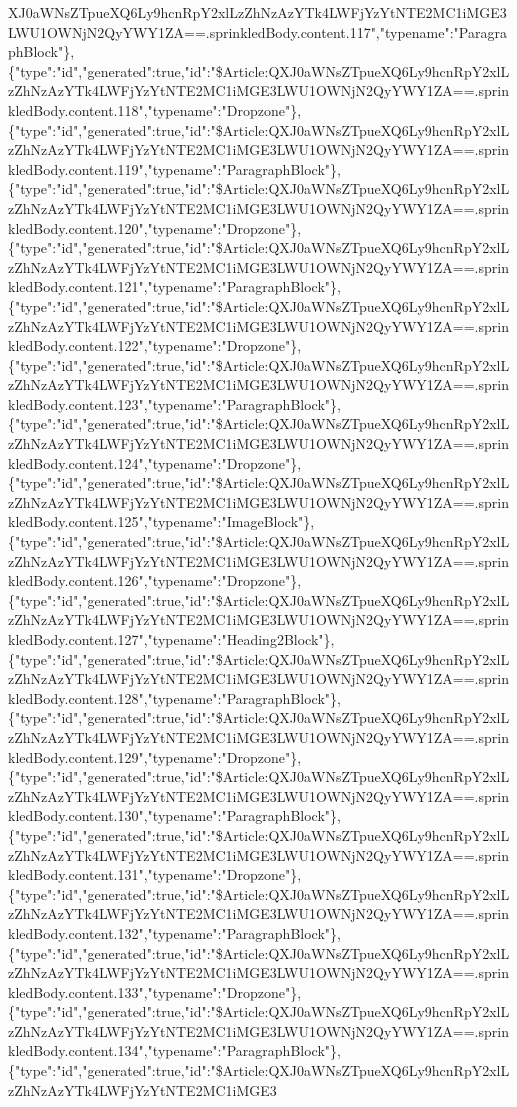 XJ0aWNsZTpueXQ6Ly9hcnRpY2xlLzZhNzAzYTk4LWFjYzYtNTE2MC1iMGE3LWU1OWNjN2QyYWY1ZA==.sprinkledBody.content.117","typename":"ParagraphBlock"\},\{"type":"id","generated":true,"id":"\$Article:QXJ0aWNsZTpueXQ6Ly9hcnRpY2xlLzZhNzAzYTk4LWFjYzYtNTE2MC1iMGE3LWU1OWNjN2QyYWY1ZA==.sprinkledBody.content.118","typename":"Dropzone"\},\{"type":"id","generated":true,"id":"\$Article:QXJ0aWNsZTpueXQ6Ly9hcnRpY2xlLzZhNzAzYTk4LWFjYzYtNTE2MC1iMGE3LWU1OWNjN2QyYWY1ZA==.sprinkledBody.content.119","typename":"ParagraphBlock"\},\{"type":"id","generated":true,"id":"\$Article:QXJ0aWNsZTpueXQ6Ly9hcnRpY2xlLzZhNzAzYTk4LWFjYzYtNTE2MC1iMGE3LWU1OWNjN2QyYWY1ZA==.sprinkledBody.content.120","typename":"Dropzone"\},\{"type":"id","generated":true,"id":"\$Article:QXJ0aWNsZTpueXQ6Ly9hcnRpY2xlLzZhNzAzYTk4LWFjYzYtNTE2MC1iMGE3LWU1OWNjN2QyYWY1ZA==.sprinkledBody.content.121","typename":"ParagraphBlock"\},\{"type":"id","generated":true,"id":"\$Article:QXJ0aWNsZTpueXQ6Ly9hcnRpY2xlLzZhNzAzYTk4LWFjYzYtNTE2MC1iMGE3LWU1OWNjN2QyYWY1ZA==.sprinkledBody.content.122","typename":"Dropzone"\},\{"type":"id","generated":true,"id":"\$Article:QXJ0aWNsZTpueXQ6Ly9hcnRpY2xlLzZhNzAzYTk4LWFjYzYtNTE2MC1iMGE3LWU1OWNjN2QyYWY1ZA==.sprinkledBody.content.123","typename":"ParagraphBlock"\},\{"type":"id","generated":true,"id":"\$Article:QXJ0aWNsZTpueXQ6Ly9hcnRpY2xlLzZhNzAzYTk4LWFjYzYtNTE2MC1iMGE3LWU1OWNjN2QyYWY1ZA==.sprinkledBody.content.124","typename":"Dropzone"\},\{"type":"id","generated":true,"id":"\$Article:QXJ0aWNsZTpueXQ6Ly9hcnRpY2xlLzZhNzAzYTk4LWFjYzYtNTE2MC1iMGE3LWU1OWNjN2QyYWY1ZA==.sprinkledBody.content.125","typename":"ImageBlock"\},\{"type":"id","generated":true,"id":"\$Article:QXJ0aWNsZTpueXQ6Ly9hcnRpY2xlLzZhNzAzYTk4LWFjYzYtNTE2MC1iMGE3LWU1OWNjN2QyYWY1ZA==.sprinkledBody.content.126","typename":"Dropzone"\},\{"type":"id","generated":true,"id":"\$Article:QXJ0aWNsZTpueXQ6Ly9hcnRpY2xlLzZhNzAzYTk4LWFjYzYtNTE2MC1iMGE3LWU1OWNjN2QyYWY1ZA==.sprinkledBody.content.127","typename":"Heading2Block"\},\{"type":"id","generated":true,"id":"\$Article:QXJ0aWNsZTpueXQ6Ly9hcnRpY2xlLzZhNzAzYTk4LWFjYzYtNTE2MC1iMGE3LWU1OWNjN2QyYWY1ZA==.sprinkledBody.content.128","typename":"ParagraphBlock"\},\{"type":"id","generated":true,"id":"\$Article:QXJ0aWNsZTpueXQ6Ly9hcnRpY2xlLzZhNzAzYTk4LWFjYzYtNTE2MC1iMGE3LWU1OWNjN2QyYWY1ZA==.sprinkledBody.content.129","typename":"Dropzone"\},\{"type":"id","generated":true,"id":"\$Article:QXJ0aWNsZTpueXQ6Ly9hcnRpY2xlLzZhNzAzYTk4LWFjYzYtNTE2MC1iMGE3LWU1OWNjN2QyYWY1ZA==.sprinkledBody.content.130","typename":"ParagraphBlock"\},\{"type":"id","generated":true,"id":"\$Article:QXJ0aWNsZTpueXQ6Ly9hcnRpY2xlLzZhNzAzYTk4LWFjYzYtNTE2MC1iMGE3LWU1OWNjN2QyYWY1ZA==.sprinkledBody.content.131","typename":"Dropzone"\},\{"type":"id","generated":true,"id":"\$Article:QXJ0aWNsZTpueXQ6Ly9hcnRpY2xlLzZhNzAzYTk4LWFjYzYtNTE2MC1iMGE3LWU1OWNjN2QyYWY1ZA==.sprinkledBody.content.132","typename":"ParagraphBlock"\},\{"type":"id","generated":true,"id":"\$Article:QXJ0aWNsZTpueXQ6Ly9hcnRpY2xlLzZhNzAzYTk4LWFjYzYtNTE2MC1iMGE3LWU1OWNjN2QyYWY1ZA==.sprinkledBody.content.133","typename":"Dropzone"\},\{"type":"id","generated":true,"id":"\$Article:QXJ0aWNsZTpueXQ6Ly9hcnRpY2xlLzZhNzAzYTk4LWFjYzYtNTE2MC1iMGE3LWU1OWNjN2QyYWY1ZA==.sprinkledBody.content.134","typename":"ParagraphBlock"\},\{"type":"id","generated":true,"id":"\$Article:QXJ0aWNsZTpueXQ6Ly9hcnRpY2xlLzZhNzAzYTk4LWFjYzYtNTE2MC1iMGE3